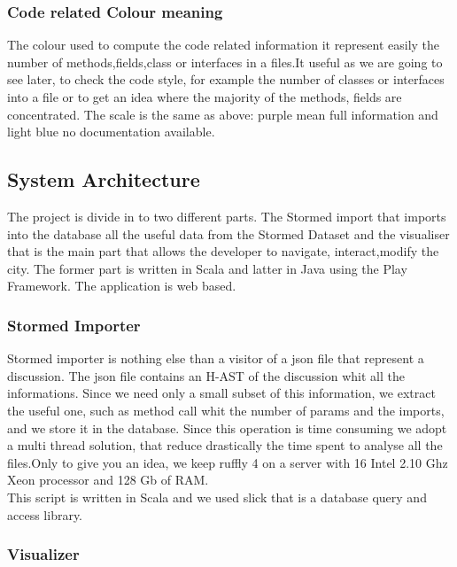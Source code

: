 \documentclass[]{usiinfbachelorproject}
\begin{document}
\subsubsection{Code related Colour meaning}

The colour used to compute the code related information it  represent easily the number of methods,fields,class or interfaces in a files.It useful as we are going to see later, to check the code style, for example the number of classes or interfaces into a file or to get an idea where the majority of the methods, fields are concentrated.
The scale is the same as above: purple mean full information and light blue no documentation available.
\newpage
\subsection{System Architecture }
The project is divide in to two different parts. The Stormed import that imports into the database all the useful data from the Stormed Dataset and the visualiser that is the main part  that allows the developer to navigate, interact,modify the city. The former part is written in Scala and latter in Java using the Play Framework. The application is web based. 
\subsubsection{Stormed Importer}
Stormed importer is nothing else than a visitor of a json file that represent a discussion. The json file contains an H-AST of the discussion whit all the informations. Since we need only a small subset of this information, we extract the useful one, such as method call whit the number of params and the imports, and we store it in the database. Since this operation is time consuming we adopt a multi thread solution, that reduce drastically the time spent to analyse all the files.Only to give you an idea, we keep ruffly 4 on a server with 16 Intel 2.10 Ghz Xeon processor and 128 Gb of RAM.\\  This script is written in Scala and we used slick that is a database query and access library.  
   

\subsubsection{Visualizer}
\end{document}
